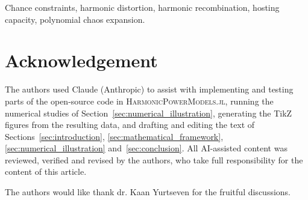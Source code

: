\documentclass[journal]{IEEEtran}
\begin{document}
\begin{IEEEkeywords}
Chance constraints, harmonic distortion, harmonic recombination, hosting capacity, polynomial chaos expansion.
\end{IEEEkeywords}

\IEEEpeerreviewmaketitle






% 

\newpage







\section*{Acknowledgement}
The authors used Claude (Anthropic) to assist with implementing and testing parts of the open-source code in \textsc{HarmonicPowerModels.jl}, running the numerical studies of Section~\ref{sec:numerical_illustration}, generating the TikZ figures from the resulting data, and drafting and editing the text of Sections~\ref{sec:introduction}, \ref{sec:mathematical_framework}, \ref{sec:numerical_illustration} and~\ref{sec:conclusion}. All AI-assisted content was reviewed, verified and revised by the authors, who take full responsibility for the content of this article.

The authors would like thank dr. Kaan Yurtseven for the fruitful discussions.



\end{document}
